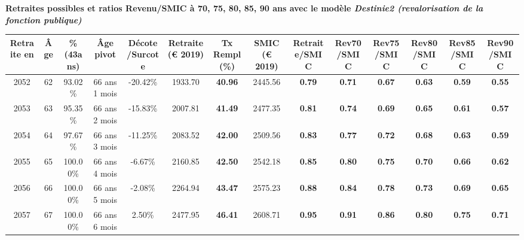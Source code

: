  \vspace{0.1cm} 
{\bf \noindent Retraites possibles et ratios Revenu/SMIC à 70, 75, 80, 85, 90 ans avec le modèle \emph{Destinie2 (revalorisation de la fonction publique)}}  
 
\begin{adjustbox}{max width=\textwidth} 
\begin{tabular}[htb]{|c|c||c|c|c||c|c||c||c|c|c|c|c|c|} 
\hline 
 Retraite en &  Âge &  \%(43ans) &  Âge pivot &  Décote/Surcote &  Retraite (\euro{} 2019) &  Tx Rempl(\%) &  SMIC (\euro{} 2019) &  Retraite/SMIC &  Rev70/SMIC &  Rev75/SMIC &  Rev80/SMIC &  Rev85/SMIC &  Rev90/SMIC \\ 
\hline \hline 
 2052 &  62 &  93.02\% &  66 ans 1 mois &  -20.42\% &  1933.70 &  {\bf 40.96} &  2445.56 &  {\bf {\color{red} 0.79}} &  {\bf {\color{red} 0.71}} &  {\bf {\color{red} 0.67}} &  {\bf {\color{red} 0.63}} &  {\bf {\color{red} 0.59}} &  {\bf {\color{red} 0.55}} \\ 
\hline 
 2053 &  63 &  95.35\% &  66 ans 2 mois &  -15.83\% &  2007.81 &  {\bf 41.49} &  2477.35 &  {\bf {\color{red} 0.81}} &  {\bf {\color{red} 0.74}} &  {\bf {\color{red} 0.69}} &  {\bf {\color{red} 0.65}} &  {\bf {\color{red} 0.61}} &  {\bf {\color{red} 0.57}} \\ 
\hline 
 2054 &  64 &  97.67\% &  66 ans 3 mois &  -11.25\% &  2083.52 &  {\bf 42.00} &  2509.56 &  {\bf {\color{red} 0.83}} &  {\bf {\color{red} 0.77}} &  {\bf {\color{red} 0.72}} &  {\bf {\color{red} 0.68}} &  {\bf {\color{red} 0.63}} &  {\bf {\color{red} 0.59}} \\ 
\hline 
 2055 &  65 &  100.00\% &  66 ans 4 mois &  -6.67\% &  2160.85 &  {\bf 42.50} &  2542.18 &  {\bf {\color{red} 0.85}} &  {\bf {\color{red} 0.80}} &  {\bf {\color{red} 0.75}} &  {\bf {\color{red} 0.70}} &  {\bf {\color{red} 0.66}} &  {\bf {\color{red} 0.62}} \\ 
\hline 
 2056 &  66 &  100.00\% &  66 ans 5 mois &  -2.08\% &  2264.94 &  {\bf 43.47} &  2575.23 &  {\bf {\color{red} 0.88}} &  {\bf {\color{red} 0.84}} &  {\bf {\color{red} 0.78}} &  {\bf {\color{red} 0.73}} &  {\bf {\color{red} 0.69}} &  {\bf {\color{red} 0.65}} \\ 
\hline 
 2057 &  67 &  100.00\% &  66 ans 6 mois &  2.50\% &  2477.95 &  {\bf 46.41} &  2608.71 &  {\bf {\color{red} 0.95}} &  {\bf {\color{red} 0.91}} &  {\bf {\color{red} 0.86}} &  {\bf {\color{red} 0.80}} &  {\bf {\color{red} 0.75}} &  {\bf {\color{red} 0.71}} \\ 
\hline 
\hline 
\end{tabular} 
\end{adjustbox} 
 
